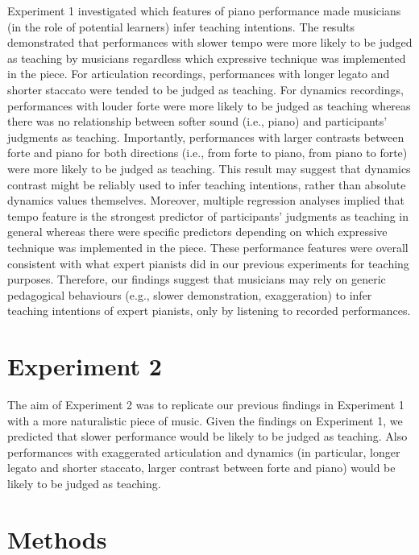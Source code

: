 \documentclass[
  man,floatsintext]{apa6}
\begin{document}
Experiment 1 investigated which features of piano performance made musicians (in the role of potential learners) infer teaching intentions. The results demonstrated that performances with slower tempo were more likely to be judged as teaching by musicians regardless which expressive technique was implemented in the piece. For articulation recordings, performances with longer legato and shorter staccato were tended to be judged as teaching. For dynamics recordings, performances with louder forte were more likely to be judged as teaching whereas there was no relationship between softer sound (i.e., piano) and participants' judgments as teaching. Importantly, performances with larger contrasts between forte and piano for both directions (i.e., from forte to piano, from piano to forte) were more likely to be judged as teaching. This result may suggest that dynamics contrast might be reliably used to infer teaching intentions, rather than absolute dynamics values themselves. Moreover, multiple regression analyses implied that tempo feature is the strongest predictor of participants' judgments as teaching in general whereas there were specific predictors depending on which expressive technique was implemented in the piece. These performance features were overall consistent with what expert pianists did in our previous experiments for teaching purposes. Therefore, our findings suggest that musicians may rely on generic pedagogical behaviours (e.g., slower demonstration, exaggeration) to infer teaching intentions of expert pianists, only by listening to recorded performances.

\clearpage

\hypertarget{experiment-2}{%
\section{Experiment 2}\label{experiment-2}}

The aim of Experiment 2 was to replicate our previous findings in Experiment 1 with a more naturalistic piece of music. Given the findings on Experiment 1, we predicted that slower performance would be likely to be judged as teaching. Also performances with exaggerated articulation and dynamics (in particular, longer legato and shorter staccato, larger contrast between forte and piano) would be likely to be judged as teaching.

\hypertarget{methods-1}{%
\section{Methods}\label{methods-1}}
\end{document}
